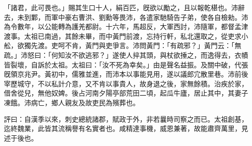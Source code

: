 \begin{pinyinscope}
「諸君，此可畏也。」賜其生口十人，絹百匹，旣欲以勵之，且以報乾椹也。沛辭去，未到鄴，而軍中豪右曹洪、劉勳等畏沛，各遣家馳騎告子弟，使各自檢勑。沛為令數年，以公能轉為護羌都尉。十六年，馬超反，大軍西討，沛隨軍，都督孟津渡事。太祖已南過，其餘未畢，而中黃門前渡，忘持行軒，私北還取之，從吏求小舩，欲獨先渡。吏呵不肯，黃門與吏爭言。沛問黃門：「有疏邪？」黃門云：「無疏。」沛怒曰：「何知汝不欲逃邪？」遂使人捽其頭，與杖欲捶之，而逸得去，衣幘皆裂壞，自訴於太祖。太祖曰：「汝不死為幸矣。」由是聲名益振。及關中破，代張旣領京兆尹。黃初中，儒雅並進，而沛本以事能見用，遂以議郎宂散里巷。沛前後宰歷城守，不以私計介意，又不肯以事貴人，故身退之後，家無餘積。治疾於家，借舍從兒，無他奴婢。後占河南夕陽亭部荒田二頃，起瓜牛廬，居止其中，其妻子凍餓。沛病亡，鄉人親友及故吏民為殯葬也。

評曰：自漢季以來，刺史總統諸郡，賦政于外，非若曩時司察之而已。太祖創基，迄終魏業，此皆其流稱譽有名實者也。咸精達事機，威恩兼著，故能肅齊萬里，見述于後也。


\end{pinyinscope}
